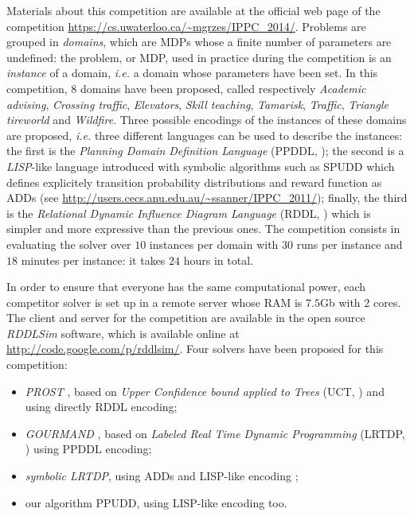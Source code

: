 Materials about this competition are available at the official web page of the competition
\url{https://cs.uwaterloo.ca/~mgrzes/IPPC_2014/}.
Problems are grouped in \textit{domains}, 
which are MDPs whose a finite number of parameters are undefined:
the problem, or MDP, used in practice during the competition
is an \textit{instance} of a domain, \textit{i.e.}
a domain whose parameters have been set.
In this competition, $8$ domains have been proposed,
called respectively
\textit{Academic advising}, \textit{Crossing traffic}, \textit{Elevators}, 
\textit{Skill teaching}, \textit{Tamarisk}, \textit{Traffic}, \textit{Triangle tireworld}
and \textit{Wildfire}.
Three possible encodings of the instances of these domains are proposed,
\textit{i.e.} three different languages can be used to describe the instances:
the first is the \textit{Planning Domain Definition Language} (PPDDL, \cite{Younes_ppddl1.0});
the second is a \textit{LISP}-like language introduced with symbolic algorithms such as SPUDD 
which defines explicitely transition probability distributions and reward function as ADDs
(see \url{http://users.cecs.anu.edu.au/~ssanner/IPPC_2011/}); 
finally, the third is the \textit{Relational Dynamic Influence Diagram Language} (RDDL, \cite{Sanner_relationaldynamic})
which is simpler and more expressive than the previous ones.
The competition consists in evaluating the solver over 
$10$ instances per domain with $30$ runs per instance and
$18$ minutes per instance: it takes $24$ hours in total.

In order to ensure that everyone has the same computational power,
each competitor solver is set up in a remote server whose RAM is $7.5$Gb 
with $2$ cores.%
The client and server for the competition are available in the open source \textit{RDDLSim} software, 
which is available online at \url{http://code.google.com/p/rddlsim/}.
Four solvers have been proposed for this competition:
\begin{itemize}
\item \textit{PROST} \cite{DBLP:conf/aips/KellerE12}, based on \textit{Upper Confidence bound applied to Trees} (UCT, \cite{Kocsis:2006:BBM:2091602.2091633})
and using directly RDDL encoding;
\item \textit{GOURMAND} \cite{DBLP:conf/aaai/KolobovMW12,Kolobov12reverseiterative}, based on \textit{Labeled Real Time Dynamic Programming} (LRTDP, \cite{Bonet03labeledrtdp})
using PPDDL encoding;
\item \textit{symbolic LRTDP}, using ADDs and LISP-like encoding \cite{symbLRTDP};
\item our algorithm PPUDD, using LISP-like encoding too.
\end{itemize}


